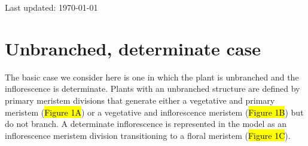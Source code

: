 \documentclass[12pt, oneside]{article}   	%
\begin{document}
 

Last updated: \today

\setlength{\abovedisplayskip}{3pt}
\setlength{\belowdisplayskip}{3pt}



\section*{Unbranched, determinate case}

The basic case we consider here is one in which the plant is unbranched and the inflorescence is determinate. Plants with an unbranched structure are defined by primary meristem divisions that generate either a vegetative and primary meristem (\hl{Figure 1A}) or a vegetative and inflorescence meristem (\hl{Figure 1B}) but do not branch. A determinate inflorescence is represented in the model as an inflorescence meristem division transitioning to a floral meristem (\hl{Figure 1C}).
\end{document}
